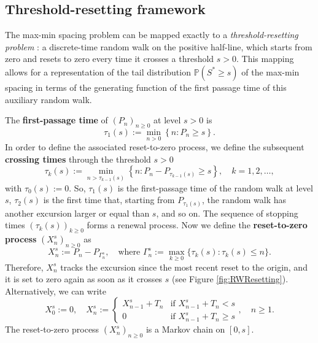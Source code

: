 \documentclass[a4paper,reqno,11pt]{amsart}
\numberwithin{equation}{section}
\def\PP{{\mathbb P}}
\numberwithin{thm}{section}
\theoremstyle{plain}
\theoremstyle{definition}
\begin{document}
{\subsection{Threshold-resetting framework}

The max-min spacing problem can be mapped exactly to a \emph{threshold-resetting problem} \cite{BiswasMajumdarPal2025,BiroliMajumdarSchehr2026}: a discrete-time random walk on the positive half-line, which starts from zero and resets to zero every time it crosses a threshold $s>0$. This mapping allows for a representation of the tail distribution $\PP(S^*\geq s)$ of the max-min spacing in terms of the generating function of the first passage time of this auxiliary random walk.


The
\textbf{first-passage time} of $(P_n)_{n\geq0}$ at level $s>0$ is 
\begin{equation}\label{def:FirstPassageTime}
\tau_1{(s)}:=\min_{n> 0}\left\{n  \colon  P_n \geq s\right\} .
\end{equation}
In order to define the associated {reset-to-zero process}, we define the subsequent \textbf{crossing times} through the threshold $s>0$
\begin{equation}\label{def:ResetTime}
    \tau_{k}{(s)}:=\min_{  n   > \tau_{k-1}(s)}\left\{n  \colon   P_n-P_{\tau_{k-1}(s)}\geq s\right\},\quad k=1,2,\ldots,  
\end{equation} 
with $\tau_0(s):=0$. 
So, $\tau_1(s)$ is the first-passage time of the random walk at level $s$, $\tau_2(s)$ is the first time that, starting from $P_{\tau_1(s)}$, the random walk has another excursion larger or equal than $s$, and so on. The sequence of stopping times $(\tau_k(s))_{k\geq0}$ forms a renewal process.
Now we define the \textbf{reset-to-zero process} $\left(X_{{n}}^s\right)_{{{n}}\geq0}$ as  
\begin{equation}\label{def:ResetToZeroDef1}
    X_{{n}}^s:=P_{{n}}-P_{\Gamma_{{n}}^s} ,\quad \text{where $\Gamma_{{n}}^s:=\max_{k\geq0}\{\tau_k(s)  \colon  \tau_k(s) \leq {{n}}\}$}.
\end{equation}
Therefore, $X_{{n}}^s$ tracks the excursion since the most recent reset to the origin, and it is set to zero again as soon as it crosses $s$ (see Figure \ref{fig:RWResetting}). Alternatively, we can write
\begin{equation}\label{def:ResetToZeroDef2}
    X_0^s:=0 ,\quad X_{{n}}^s:=
    \begin{cases}
        X_{{{n}}-1}^s+T_{{n}}  &\text{if $X_{{{n}}-1}^s+T_{{n}}< s$}\\
        0  &\text{if $X_{{{n}}-1}^s+T_{{n}}\geq  s$}
    \end{cases} ,\quad {{n}}\geq 1.
\end{equation}
The reset-to-zero process $
\left(X_{{{n}}}^s\right)_{{{n}}\geq0}$ is a Markov chain on $[0,s]$.

}
\end{document}
